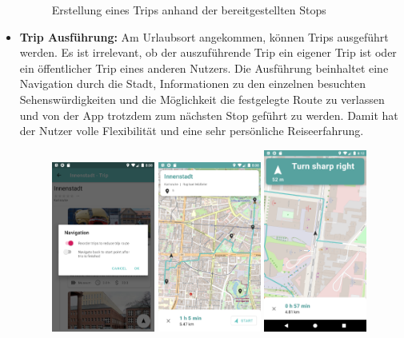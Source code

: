 \begin{itemize}
\begin{figure}[ht!]
		\caption{Erstellung eines Trips anhand der bereitgestellten Stops}
		\label{fig:ui_trip_creation}
	\end{figure}

	\newpage
	
	\item \textbf{Trip Ausführung:} Am Urlaubsort angekommen, können Trips ausgeführt werden. Es ist irrelevant, ob der auszuführende Trip ein eigener Trip ist oder ein öffentlicher Trip eines anderen Nutzers. Die Ausführung beinhaltet eine Navigation durch die Stadt, Informationen zu den einzelnen besuchten Sehenswürdigkeiten und die Möglichkeit die festgelegte Route zu verlassen und von der App trotzdem zum nächsten Stop geführt zu werden. Damit hat der Nutzer volle Flexibilität und eine sehr persönliche Reiseerfahrung.
	
	\begin{figure}[ht!]
		\includegraphics[width=0.32\textwidth]{images/travlyn-screenshot-start-navigation-dialog.png}
		\includegraphics[width=0.32\textwidth]{images/travlyn-screenshot-navigation-overview.png}
		\includegraphics[width=0.32\textwidth]{images/travlyn-screenshot-navigation.png}

\end{figure}
\end{itemize}

